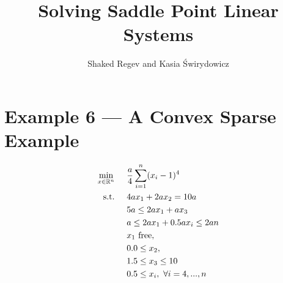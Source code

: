 \documentclass[11pt,letterpaper]{article}
\title{$ $
\\[-100pt] Solving Saddle Point Linear Systems}
\author{Shaked Regev and Kasia \'{S}wirydowicz}
\begin{document}

\section{Example 6 --- A Convex Sparse Example}
\begin{align}
&&&&\min_{x\in\mathbb{R}^n} & \hspace{0.5cm} \frac{a}{4}\sum_{i=1}^{n} (x_i-1)^4 &&&& \label{ex6:obj}\\
&&&&\textnormal{s.t.} &\hspace{0.5cm}  4ax_1+2ax_2 = 10a &&&& \label{ex6:eq1}\\
&&&&& \hspace{0.5cm} 5a \leq  2ax_1 + ax_3                 &&&& \label{ex6:ineq1}\\
&&&&& \hspace{0.5cm}  a \leq  2ax_1       + 0.5ax_i \leq 2an &&&& \label{ex6:ineq2}\\
&&&&& \hspace{0.5cm}  x_1~\textnormal{free}, &&&& \label{ex6:varb1}\\
&&&&& \hspace{0.5cm}  0.0 \leq x_2, &&&& \label{ex6:varb2}\\
&&&&& \hspace{0.5cm}  1.5 \leq x_3 \leq 10  &&&& \label{ex6:varb3}\\
&&&&& \hspace{0.5cm}  0.5 \leq x_i, \ \forall i=4,...,n               &&& \label{ex6:varb4}
\end{align}
\end{document}
